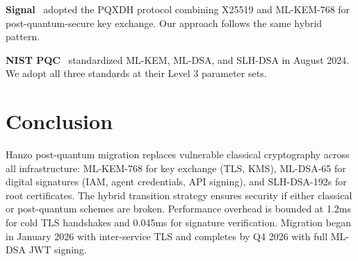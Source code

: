 \documentclass[11pt]{article}
\begin{document}
\textbf{Signal}~\cite{signalpq} adopted the PQXDH protocol combining X25519
and ML-KEM-768 for post-quantum-secure key exchange. Our approach follows the
same hybrid pattern.

\textbf{NIST PQC}~\cite{nistpq} standardized ML-KEM, ML-DSA, and SLH-DSA in
August 2024. We adopt all three standards at their Level 3 parameter sets.

\section{Conclusion}
\label{sec:conclusion}

Hanzo post-quantum migration replaces vulnerable classical cryptography across
all infrastructure: ML-KEM-768 for key exchange (TLS, KMS), ML-DSA-65 for
digital signatures (IAM, agent credentials, API signing), and SLH-DSA-192s for
root certificates. The hybrid transition strategy ensures security if either
classical or post-quantum schemes are broken. Performance overhead is bounded
at 1.2ms for cold TLS handshakes and 0.045ms for signature verification.
Migration began in January 2026 with inter-service TLS and completes by Q4
2026 with full ML-DSA JWT signing.
\end{document}
